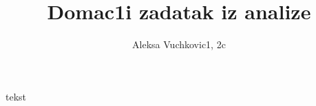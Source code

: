 \documentclass[11pt]{article}
\title{\bf{Domac1i zadatak iz analize}}
\author{\Large Aleksa Vuchkovic1, 2c}
\date{}
\begin{document}
\maketitle
\large
\begin{zad}
tekst

\end{zad}
\end{document}
